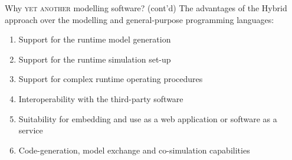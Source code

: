 \documentclass[compress,newPxFont,sthlmFooter]{beamer}
\begin{document}
\begin{frame}{Why \textsc{yet another} modelling software? (cont'd)}
  The advantages of the \alert{Hybrid} approach over the \alert{modelling} and \alert{general-purpose} programming languages:
    \begin{enumerate}
        \item Support for the \alert{runtime model generation}
        \item Support for the \alert{runtime simulation set-up}
        \item Support for \alert{complex runtime operating procedures}
        \item \alert{Interoperability} with the \alert{third-party software}
        \item Suitability for \alert{embedding} and use as a \alert{web application} or \alert{software as a service}
        \item \alert{Code-generation}, \alert{model exchange} and \alert{co-simulation} capabilities  
    \end{enumerate}
\end{frame}
% 
%     
\end{document}
